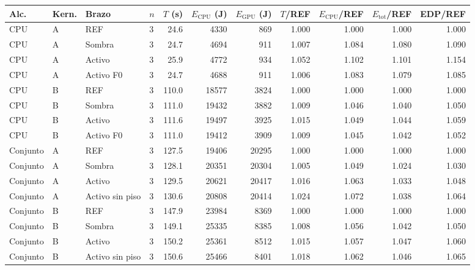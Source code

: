 \begin{tabular}{@{}llllrrrrrrr@{}}
\toprule
\textbf{Alc.} & \textbf{Kern.} & \textbf{Brazo} & \textbf{$n$} & \textbf{$T$ (s)} & \textbf{$E_{\mathrm{CPU}}$ (J)} & \textbf{$E_{\mathrm{GPU}}$ (J)} & \textbf{$T$/REF} & \textbf{$E_{\mathrm{CPU}}$/REF} & \textbf{$E_{\mathrm{tot}}$/REF} & \textbf{EDP/REF} \\
\midrule
CPU & A & REF & 3 & 24.6 & 4330 & 869 & 1.000 & 1.000 & 1.000 & 1.000 \\
CPU & A & Sombra & 3 & 24.7 & 4694 & 911 & 1.007 & 1.084 & 1.080 & 1.090 \\
CPU & A & Activo & 3 & 25.9 & 4772 & 934 & 1.052 & 1.102 & 1.101 & 1.154 \\
CPU & A & Activo F0 & 3 & 24.7 & 4688 & 911 & 1.006 & 1.083 & 1.079 & 1.085 \\
\midrule
CPU & B & REF & 3 & 110.0 & 18577 & 3824 & 1.000 & 1.000 & 1.000 & 1.000 \\
CPU & B & Sombra & 3 & 111.0 & 19432 & 3882 & 1.009 & 1.046 & 1.040 & 1.050 \\
CPU & B & Activo & 3 & 111.6 & 19497 & 3925 & 1.015 & 1.049 & 1.044 & 1.059 \\
CPU & B & Activo F0 & 3 & 111.0 & 19412 & 3909 & 1.009 & 1.045 & 1.042 & 1.052 \\
\midrule
Conjunto & A & REF & 3 & 127.5 & 19406 & 20295 & 1.000 & 1.000 & 1.000 & 1.000 \\
Conjunto & A & Sombra & 3 & 128.1 & 20351 & 20304 & 1.005 & 1.049 & 1.024 & 1.030 \\
Conjunto & A & Activo & 3 & 129.5 & 20621 & 20417 & 1.016 & 1.063 & 1.033 & 1.048 \\
Conjunto & A & Activo sin piso & 3 & 130.6 & 20808 & 20414 & 1.024 & 1.072 & 1.038 & 1.064 \\
\midrule
Conjunto & B & REF & 3 & 147.9 & 23984 & 8369 & 1.000 & 1.000 & 1.000 & 1.000 \\
Conjunto & B & Sombra & 3 & 149.1 & 25335 & 8385 & 1.008 & 1.056 & 1.042 & 1.050 \\
Conjunto & B & Activo & 3 & 150.2 & 25361 & 8512 & 1.015 & 1.057 & 1.047 & 1.060 \\
Conjunto & B & Activo sin piso & 3 & 150.6 & 25466 & 8401 & 1.018 & 1.062 & 1.046 & 1.065 \\
\bottomrule
\end{tabular}
